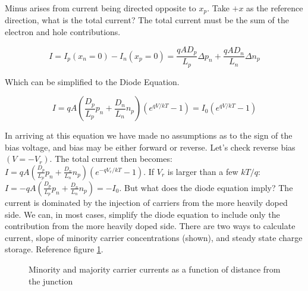 \documentclass[main.tex]{subfiles}
\begin{document}
\begin{enumerate}
\begin{enumerate}
        Minus arises from current being directed opposite to $x_p$. Take $+x$ as the reference direction, what is the total current? The total current must be the sum of the electron and hole contributions.

        $$
        I=I_p\left(x_n=0\right)-I_n\left(x_p=0\right)=\frac{q A D_p}{L_p} \Delta p_n+\frac{q A D_n}{L_n} \Delta n_p
        $$

        Which can be simplified to the Diode Equation.

        $$
        I=q A\left(\frac{D_p}{L_p} p_n+\frac{D_n}{L_n} n_p\right)\left(e^{q V / k T}-1\right)=I_0\left(e^{q V / k T}-1\right)
        $$

        In arriving at this equation we have made no assumptions as to the sign of the bias voltage, and bias may be either forward or reverse. Let's check reverse bias $\left(V=-V_r\right)$. The total current then becomes: $I=q A\left(\frac{D_p}{L_p} p_n+\frac{D_n}{L_n} n_p\right)\left(e^{-q V_r / k T}-1\right)$. If $V_r$ is larger than a few $k T / q$: $I=-q A\left(\frac{D_p}{L_p} p_n+\frac{D_n}{L_n} n_p\right)=-I_0$. But what does the diode equation imply? The current is dominated by the injection of carriers from the more heavily doped side. We can, in most cases, simplify the diode equation to include only the contribution from the more heavily doped side. There are two ways to calculate current, slope of minority carrier concentrations (shown), and steady state charge storage. Reference figure \ref{fig:18ad_c}.

        \begin{figure}
        \centering{}
        \caption{Minority and majority carrier currents as a function of distance from the junction}
        \label{fig:18ad_c}
        \end{figure}

    \end{enumerate}

\end{enumerate}
\end{document}
